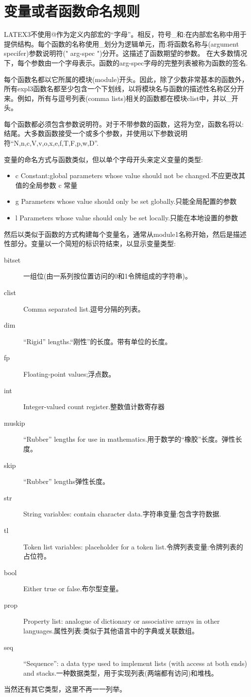 \section{变量或者函数命名规则}
LATEX3不使用@作为定义内部宏的“字母”。相反，符号\_和:在内部宏名称中用于提供结构。每个函数的名称使用\_划分为逻辑单元，而:将函数名称与(argument specifer)参数说明符(" arg-spec ")分开。这描述了函数期望的参数。
在大多数情况下，每个参数由一个字母表示。函数的arg-spec字母的完整列表被称为函数的签名.

每个函数名都以它所属的模块(module)开头。因此，除了少数非常基本的函数外，所有expl3函数名都至少包含一个下划线，以将模块名与函数的描述性名称区分开来。例如，所有与逗号列表(comma lists)相关的函数都在模块clist中，并以\_开头。

每个函数都必须包含参数说明符。对于不带参数的函数，这将为空，函数名将以:结尾。大多数函数接受一个或多个参数，并使用以下参数说明符``N,n,c,V,v,o,x,e,f,T,F,p,w,D''.

变量的命名方式与函数类似，但以单个字母开头来定义变量的类型:
\begin{itemize}
	\item c Constant:global parameters whose value should not be changed.不应更改其值的全局参数  c 常量
	\item g Parameters whose value should only be set globally.只能全局配置的参数
	\item l Parameters whose value should only be set locally.只能在本地设置的参数
\end{itemize}

然后以类似于函数的方式构建每个变量名，通常从module1名称开始，然后是描述性部分。变量以一个简短的标识符结束，以显示变量类型:

\begin{description}
	
	\item [bitset] 一组位(由一系列按位置访问的0和1令牌组成的字符串)。
	\item [clist] Comma separated list.逗号分隔的列表。
	\item [dim] “Rigid” lengths.“刚性”的长度。带有单位的长度。
	\item [fp] Floating-point values;浮点数。
	\item [int] Integer-valued count register.整数值计数寄存器
	\item [muskip] “Rubber” lengths for use in mathematics.用于数学的“橡胶”长度。弹性长度。
	\item [skip] “Rubber” lengths弹性长度。
	\item [str]String variables: contain character data.字符串变量:包含字符数据.
	\item [tl] Token list variables: placeholder for a token list.令牌列表变量:令牌列表的占位符。
	\item [bool] Either true or false.布尔型变量。
	\item [prop] Property list: analogue of dictionary or associative arrays in other languages.属性列表:类似于其他语言中的字典或关联数组。
	\item [seq] “Sequence”: a data type used to implement lists (with access at both ends) and	stacks.一种数据类型，用于实现列表(两端都有访问)和堆栈。	
\end{description}
当然还有其它类型，这里不再一一列举。
